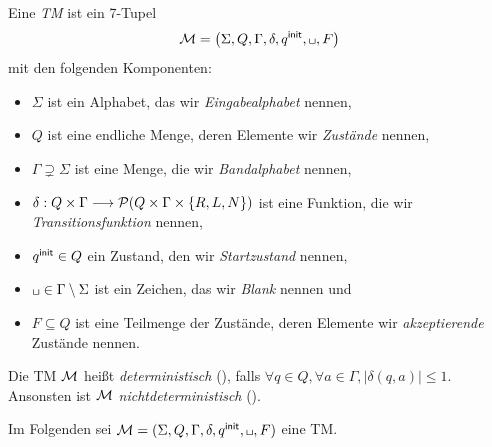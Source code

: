 \begin{Def}[name={[\acf{TM}]}]\label{def:4.tm}
	Eine \emph{\acf{TM}} ist ein 7-Tupel
	\begin{equation*}
		\M=\left(\Sigma,Q,\Gamma,\delta,\qinit,\blank,F\right)
	\end{equation*}
	mit den folgenden Komponenten:
	\begin{itemize}
		\item $\Sigma$ ist ein Alphabet, das wir \emph{Eingabealphabet} nennen,
		\item $Q$ ist eine endliche Menge, deren Elemente wir \emph{Zustände} nennen,
		\item $\Gamma\supsetneq\Sigma$ ist eine Menge, die wir \emph{Bandalphabet} nennen,
		\item $\delta: Q\times\Gamma\--> \Powerset(Q\times\Gamma\times\{R,L,N\})$ ist eine Funktion, die wir \emph{Transitionsfunktion} nennen,
		\item $q^\mathsf{init}\in Q$ ein Zustand, den wir \emph{Startzustand} nennen,
		\item $\blank\in\Gamma\setminus\Sigma$ ist ein Zeichen, das wir \emph{Blank} nennen und
		\item $F\subseteq Q$ ist eine Teilmenge der Zustände, deren Elemente wir \emph{akzeptierende} Zustände nennen.
	\end{itemize}
	Die \ac{TM} $\mathcal{M}$ heißt \emph{deterministisch}
	(), falls $\forall q\in Q, \forall a\in\Gamma, |\delta
	(q,a)| \le 1$.
	Ansonsten ist $\mathcal{M}$ \emph{nichtdeterministisch} ().
\end{Def}


Im Folgenden sei $\M=(\Sigma, Q, \Gamma, \delta, \qinit, \blank, F)$ eine \ac{TM}.


